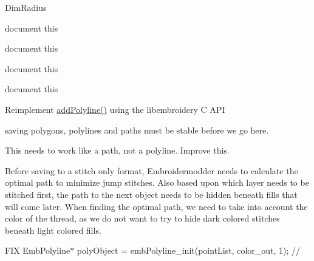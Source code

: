 \begin{DoxyRefList}
Dim\+Radius  
\item[Member \mbox{\hyperlink{classPropertyEditor_af77a9b50a881ba48136c67f40c274e1e}{Property\+Editor\+::create\+Combo\+Box\+Selected}} ()]\label{todo__todo000033}%
%
document this  
\item[Member \mbox{\hyperlink{classPropertyEditor_a25880d96f0b4466fc4342255adaa7022}{Property\+Editor\+::create\+Tool\+Button\+QSelect}} ()]\label{todo__todo000034}%
%
document this  
\item[Member \mbox{\hyperlink{classPropertyEditor_ad7452c5931d2f0c7f63a308d1ccccfc7}{Property\+Editor\+::event\+Filter}} (QObject $\ast$obj, QEvent $\ast$event)]\label{todo__todo000032}%
%
document this  
\item[Member \mbox{\hyperlink{classPropertyEditor_a4bca2abc45a97402b7135f7b8407d125}{Property\+Editor\+::$\sim$\+Property\+Editor}} ()]\label{todo__todo000031}%
%
document this  
\item[Member \mbox{\hyperlink{classSaveObject_ae11f893d999e959825a7ee160b269e51}{Save\+Object\+::add\+Path}} (Emb\+Pattern $\ast$pattern, QGraphics\+Item $\ast$item)]\label{todo__todo000024}%
%
Reimplement \mbox{\hyperlink{classSaveObject_ace37a0a25fcffac8075e6814ed54255a}{add\+Polyline()}} using the libembroidery C API  
\item[Member \mbox{\hyperlink{classSaveObject_afb37e4cd771449c65d3023d2e51bf40a}{Save\+Object\+::add\+Text\+Single}} (Emb\+Pattern $\ast$pattern, QGraphics\+Item $\ast$item)]\label{todo__todo000025}%
%
saving polygons, polylines and paths must be stable before we go here.

\label{todo__todo000026}%
%
This needs to work like a path, not a polyline. Improve this.  
\item[Member \mbox{\hyperlink{classSaveObject_a450a41fe8347cc65b1c72caeeab38e67}{Save\+Object\+::save}} (QString file\+Name)]\label{todo__todo000023}%
%
Before saving to a stitch only format, Embroidermodder needs to calculate the optimal path to minimize jump stitches. Also based upon which layer needs to be stitched first, the path to the next object needs to be hidden beneath fills that will come later. When finding the optimal path, we need to take into account the color of the thread, as we do not want to try to hide dark colored stitches beneath light colored fills.  
\item[Member \mbox{\hyperlink{classSaveObject_a0d041d54c0440f2ea8393c67df3c25a9}{Save\+Object\+::to\+Polyline}} (Emb\+Pattern $\ast$pattern, const QPointF \&obj\+Pos, const QPainter\+Path \&obj\+Path, QString layer, const QColor \&color, QString line\+Type, QString line\+Weight)]\label{todo__todo000027}%
%
FIX Emb\+Polyline$\ast$ poly\+Object = emb\+Polyline\+\_\+init(point\+List, color\+\_\+out, 1); //


\end{DoxyRefList}
